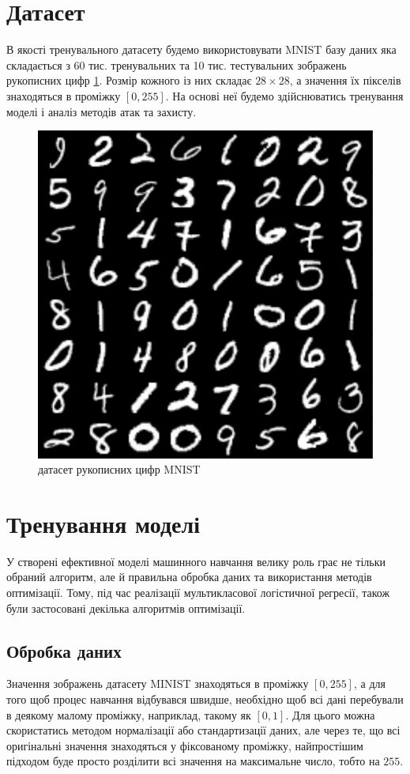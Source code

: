 \documentclass[a4paper,14pt]{extreport}
\begin{document}
	\section{Датасет}
	В якості тренувального датасету будемо використовувати MNIST базу даних яка складається з 60 тис. тренувальних та 10 тис. тестувальних зображень рукописних цифр \ref{fig:minist_dataset}. Розмір кожного із них складає $28 \times 28$, а значення їх пікселів знаходяться в проміжку $[0, 255]$. На основі неї будемо здійснюватись тренування моделі і аналіз методів атак та захисту.
	\begin{figure}[h]
		\centering
		\includegraphics[width=0.4 \textwidth]{resources/minist_dataset.pdf}
		\caption{датасет рукописних цифр MNIST}
		\label{fig:minist_dataset}
	\end{figure}

	
	\section{Тренування моделі}
	\label{sec:model}
	У створені ефективної моделі машинного навчання велику роль грає не тільки обраний алгоритм, але й правильна обробка даних та використання методів оптимізації. Тому, під час реалізації мультикласової логістичної регресії, також були застосовані декілька алгоритмів оптимізації.
	
	\subsection{Обробка даних}
	Значення зображень датасету MINIST знаходяться в проміжку $[0, 255]$, а для того щоб процес навчання відбувався швидше, необхідно щоб всі дані перебували в деякому малому проміжку, наприклад, такому як $[0, 1]$. Для цього можна скористатись методом нормалізації або стандартизації даних, але через те, що всі оригінальні значення знаходяться у фіксованому проміжку, найпростішим підходом буде просто розділити всі значення на максимальне число, тобто на $255$.
\end{document}
